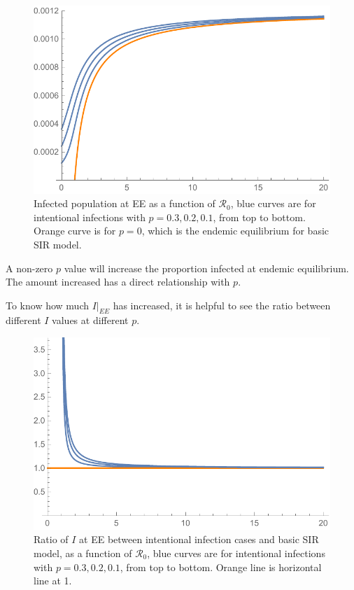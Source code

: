 \documentclass[12pt]{article}
\newcommand{\R}{\mathcal{R}}
\begin{document}
\begin{figure}[H]
  \caption{Infected population at EE as a function of $\R_0$, blue curves are for intentional infections with $p=0.3,0.2,0.1$, from top to bottom. Orange curve is for $p=0$, which is the endemic equilibrium for basic SIR model.}
  \centering
  \includegraphics[width=1.1\textwidth]{Figures/I_at_E_E_SIR_vs_Int.pdf}
\end{figure}

A non-zero $p$ value will increase the proportion infected at endemic equilibrium. The amount increased has a direct relationship with $p$. 

To know how much $I|_{EE}$ has increased, it is helpful to see the ratio between different $I$ values at different $p$.

\begin{figure}[H]
  \centering
  \includegraphics[width=1.1\textwidth]{Figures/I_at_E_E__Ratio_plot.pdf}
  \caption{Ratio of $I$ at EE between intentional infection cases and basic SIR model, as a function of $\R_0$, blue curves are for intentional infections with $p=0.3,0.2,0.1$, from top to bottom. Orange line is horizontal line at 1.}
\end{figure}
\end{document}
